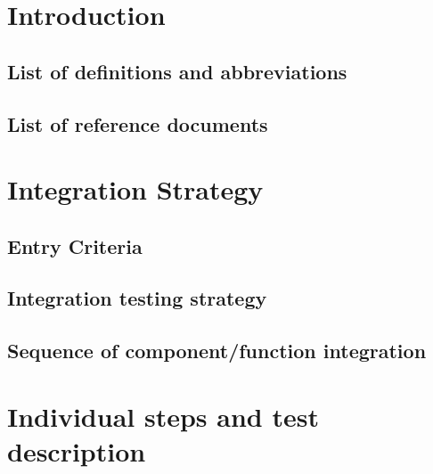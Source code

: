 \documentclass{../Common/Structure/doc_pdf}
\begin{document}
\titleToc
\newcommand{\testCase}[7]{%
	\unbreakableBlock{%
		\vspace{0.5em}
		\paragraphnewline{Test Case I#1}
		\newline
		\begin{tabulary}{\linewidth}{Y{3cm}|X{8.25cm}}
			\textbf{Test Item(s)} & #2 $\rightarrow$ #3 \\ \hline
			\textbf{Input Specification} & #4 \\ \hline
			\textbf{Output Specification} & #5 \\ \hline
			\textbf{Environmental Needs} & #6 \\ \hline
			\textbf{Target} & #7 \\
		\end{tabulary}
		\vspace{0.5em}%
	}%
}
\chapter{Introduction}

\section{List of definitions and abbreviations}

\section{List of reference documents}

\newpage

\chapter{Integration Strategy}
\section{Entry Criteria}

\section{Integration testing strategy}

\section{Sequence of component/function integration}


\chapter{Individual steps and test description}

\end{document}
